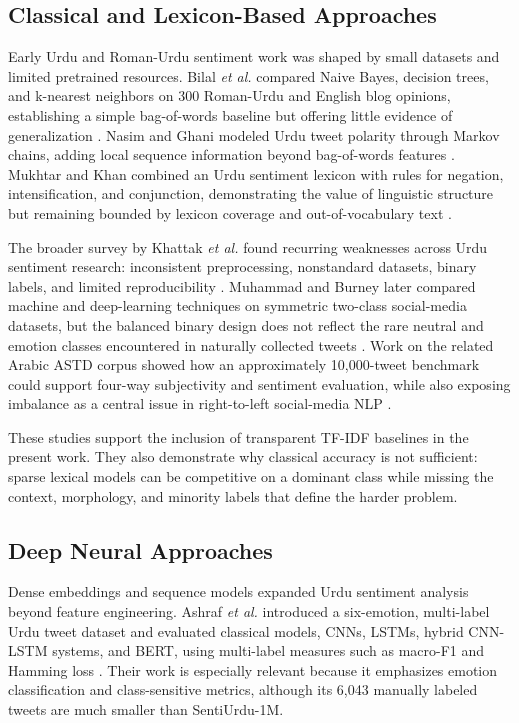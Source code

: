 \documentclass[conference]{IEEEtran}
\begin{document}
\subsection{Classical and Lexicon-Based Approaches}
Early Urdu and Roman-Urdu sentiment work was shaped by small datasets and limited pretrained resources. Bilal \emph{et al.} compared Naive Bayes, decision trees, and k-nearest neighbors on 300 Roman-Urdu and English blog opinions, establishing a simple bag-of-words baseline but offering little evidence of generalization \cite{bilal2016roman}. Nasim and Ghani modeled Urdu tweet polarity through Markov chains, adding local sequence information beyond bag-of-words features \cite{nasim2020markov}. Mukhtar and Khan combined an Urdu sentiment lexicon with rules for negation, intensification, and conjunction, demonstrating the value of linguistic structure but remaining bounded by lexicon coverage and out-of-vocabulary text \cite{mukhtar2020lexicon}.

The broader survey by Khattak \emph{et al.} found recurring weaknesses across Urdu sentiment research: inconsistent preprocessing, nonstandard datasets, binary labels, and limited reproducibility \cite{khattak2021survey}. Muhammad and Burney later compared machine and deep-learning techniques on symmetric two-class social-media datasets, but the balanced binary design does not reflect the rare neutral and emotion classes encountered in naturally collected tweets \cite{muhammad2023innovations}. Work on the related Arabic ASTD corpus showed how an approximately 10,000-tweet benchmark could support four-way subjectivity and sentiment evaluation, while also exposing imbalance as a central issue in right-to-left social-media NLP \cite{nabil2015astd}.

These studies support the inclusion of transparent TF-IDF baselines in the present work. They also demonstrate why classical accuracy is not sufficient: sparse lexical models can be competitive on a dominant class while missing the context, morphology, and minority labels that define the harder problem.

\subsection{Deep Neural Approaches}
Dense embeddings and sequence models expanded Urdu sentiment analysis beyond feature engineering. Ashraf \emph{et al.} introduced a six-emotion, multi-label Urdu tweet dataset and evaluated classical models, CNNs, LSTMs, hybrid CNN-LSTM systems, and BERT, using multi-label measures such as macro-F1 and Hamming loss \cite{ashraf2022multilabel}. Their work is especially relevant because it emphasizes emotion classification and class-sensitive metrics, although its 6,043 manually labeled tweets are much smaller than SentiUrdu-1M.
\end{document}
